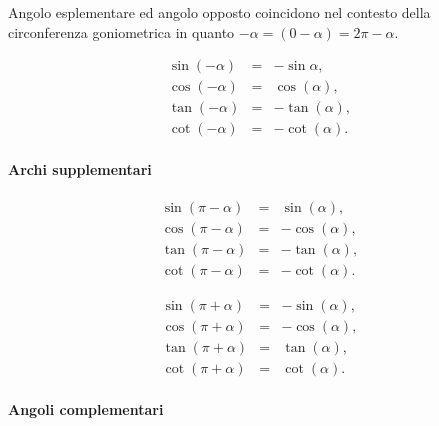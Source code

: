 Angolo esplementare ed angolo opposto coincidono nel contesto della circonferenza goniometrica in quanto $-\alpha=(0-\alpha)=2\pi-\alpha$.

\begin{definition}
    \begin{equation*}
        \begin{matrix}
            \sin(-\alpha)&=&-\sin\alpha,\\
            \cos(-\alpha)&=&\cos(\alpha),\\
            \tan(-\alpha)&=&-\tan(\alpha),\\
            \cot(-\alpha)&=&-\cot(\alpha).
        \end{matrix}
    \end{equation*}
\end{definition}

\paragraph{Archi supplementari}
\begin{definition}
    \begin{equation*}
        \begin{matrix}
            \sin(\pi-\alpha)&=&\sin(\alpha),\\
            \cos(\pi-\alpha)&=&-\cos(\alpha),\\
            \tan(\pi-\alpha)&=&-\tan(\alpha),\\
            \cot(\pi-\alpha)&=&-\cot(\alpha).
        \end{matrix}
    \end{equation*}
\end{definition}

\begin{definition}
    \begin{equation*}
        \begin{matrix}
            \sin(\pi+\alpha)&=&-\sin(\alpha),\\
            \cos(\pi+\alpha)&=&-\cos(\alpha),\\
            \tan(\pi+\alpha)&=&\tan(\alpha),\\
            \cot(\pi+\alpha)&=&\cot(\alpha).
        \end{matrix}
    \end{equation*}
\end{definition}

\paragraph{Angoli complementari}

